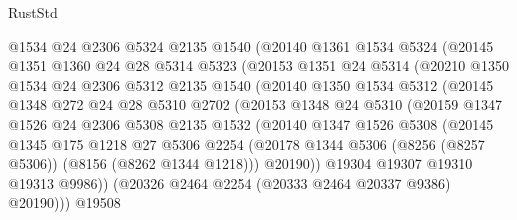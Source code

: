 \begin{lexlean}{RustStd}
\begin{coremodule}
                @1534
                @24
                @2306
                @5324
                @2135
                @1540
                (@20140
                  @1361
                  @1534
                  @5324
                  (@20145
                    @1351
                    @1360
                    @24
                    @28
                    @5314
                    @5323
                    (@20153
                      @1351
                      @24
                      @5314
                      (@20210
                        @1350
                        @1534
                        @24
                        @2306
                        @5312
                        @2135
                        @1540
                        (@20140
                          @1350
                          @1534
                          @5312
                          (@20145
                            @1348
                            @272
                            @24
                            @28
                            @5310
                            @2702
                            (@20153
                              @1348
                              @24
                              @5310
                              (@20159
                                @1347
                                @1526
                                @24
                                @2306
                                @5308
                                @2135
                                @1532
                                (@20140
                                  @1347
                                  @1526
                                  @5308
                                  (@20145
                                    @1345
                                    @175
                                    @1218
                                    @27
                                    @5306
                                    @2254
                                    (@20178
                                      @1344
                                      @5306
                                      (@8256 (@8257 @5306))
                                      (@8156 (@8262 @1344 @1218)))
                                    @20190))
                                @19304
                                @19307
                                @19310
                                @19313
                                @9986))
                            (@20326 @2464 @2254 (@20333 @2464 @20337 @9386) @20190)))
                        @19508

\end{coremodule}
\end{lexlean}
